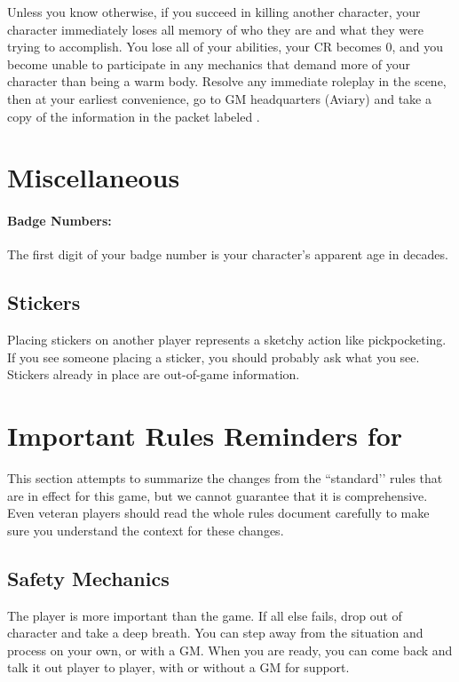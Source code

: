 \documentclass[sheet]{GL2020}
\begin{document}
Unless you know otherwise, if you succeed in killing another character, your character immediately loses all memory of who they are and what they were trying to accomplish. You lose all of your abilities, your CR becomes 0, and you become unable to participate in any mechanics that demand more of your character than being a warm body. Resolve any immediate roleplay in the scene, then at your earliest convenience, go to GM headquarters (Aviary) and take a copy of the information in the packet labeled \sMurderConsequences{}.


\section{Miscellaneous}

\paragraph{Badge Numbers:} The first digit of your badge number is your character's apparent age in decades.

\subsection{Stickers}
Placing stickers on another player represents a sketchy action like pickpocketing. If you see someone placing a sticker, you should probably ask what you see. Stickers already in place are out-of-game information.

\section{Important Rules Reminders for \gamename}
This section attempts to summarize the changes from the ``standard’’ rules that are in effect for this game, but we cannot guarantee that it is comprehensive. Even veteran players should read the whole rules document carefully to make sure you understand the context for these changes.

\subsection{Safety Mechanics}
The player is more important than the game. If all else fails, drop out of character and take a deep breath. You can step away from the situation and process on your own, or with a GM. When you are ready, you can come back and talk it out player to player, with or without a GM for support.
\end{document}
